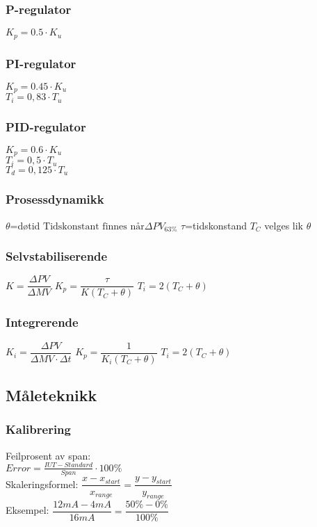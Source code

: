 \subsubsection*{P-regulator}
$K_p = 0.5\cdot K_u$
\subsubsection*{PI-regulator}
$K_p = 0.45\cdot K_u$\\
$T_i = 0,83\cdot T_u$\\
\subsubsection*{PID-regulator}
$K_p = 0.6\cdot K_u$\\
$T_i = 0,5\cdot T_u$\\
$T_d = 0,125\cdot T_u$\\
\vskip 2.5pt 
\subsubsection*{Prosessdynamikk}
\vskip 2.5pt 
$\theta$=døtid
\vskip 2.5pt 
$ \text{Tidskonstant finnes når} \Delta PV_{63\%}$
\vskip 2.5pt 
$\tau$=tidskonstand
\vskip 2.5pt 
$T_C$ velges lik $\theta$
\vskip 2.5pt 
\subsubsection*{Selvstabiliserende}
\vskip 2.5pt 
$K=\dfrac{\Delta PV}{\Delta MV} $
\vskip 2.5pt 
$K_p=\dfrac{\tau}{K(T_C+\theta)}$
\vskip 2.5pt 
$T_i=2(T_C+\theta)$
\vskip 2.5pt 
\subsubsection*{Integrerende}
\vskip 2.5pt 
$K_i=\dfrac{\Delta PV}{\Delta MV \cdot {\Delta t}}$
\vskip 2.5pt 
$K_p=\dfrac{1}{K_i(T_C+\theta)}$
\vskip 2.5pt 
$T_i=2(T_C+\theta)$\\
\subsection{Måleteknikk}
\subsubsection*{Kalibrering}
Feilprosent av span:\\
$Error=\frac {IUT-Standard}{Span} \cdot 100\% $\\
\vskip 2.5pt 
Skaleringsformel:
\vskip 2.5pt 
$\dfrac{x-x_{start}}{x_{range}}=\dfrac{y-y_{start}}{y_{range}}$\\
Eksempel: $\dfrac{12mA-4mA}{16mA}=\dfrac{50\%-0\%}{100\%}$

